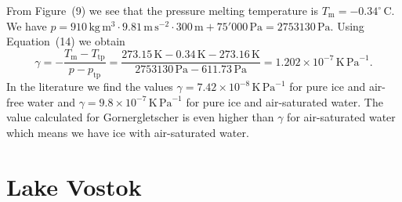 \documentclass[DIV15,11pt,parskip=half]{scrartcl}
\newcommand{\cels}[1]{\ensuremath{#1^{\circ}\,\mathrm{C}}}
\begin{document}
From Figure~(9) we see that the pressure melting temperature is $T_{\text{m}} = -\cels{0.34}$. We have $p = 910\,\text{kg}\,\text{m}^{3} \cdot 9.81\,\text{m}\,\text{s}^{-2}\cdot 300\,\text{m} + 75'000\,\text{Pa} = 2753130\,\text{Pa}$. Using Equation~(14) we obtain
  \begin{equation*}
    \gamma = -\frac{T_{\text{m}}-T_{\text{tp}}}{p - p_{\text{tp}}} = \frac{273.15\,\text{K} -0.34\,\text{K} -273.16\,\text{K}}{2753130\,\text{Pa} - 611.73\,\text{Pa}} = 1.202\times 10^{-7}\,\text{K}\,\text{Pa}^{-1}.
  \end{equation*} In the literature we find the values $\gamma = 7.42 \times 10^{-8} \,\text{K}\,\text{Pa}^{-1}$ for pure ice and air-free water and $\gamma = 9.8 \times 10^{-7} \,\text{K}\,\text{Pa}^{-1}$ for pure ice and air-saturated water. The value calculated for Gornergletscher is even higher than $\gamma$ for air-saturated water which means we have ice with air-saturated water.


\section{Lake Vostok}
\end{document}
